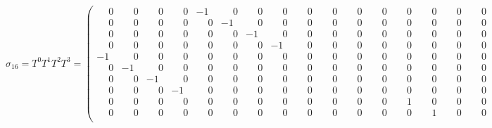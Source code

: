 \documentclass[10pt]{article}
\begin{document}
\[
\sigma_{16} = T^0T^1T^2T^3 = \left(\begin{smallmatrix}
\phantom{-}0 & \phantom{-}0 & \phantom{-}0 & \phantom{-}0 & -1 & \phantom{-}0 & \phantom{-}0 & \phantom{-}0 & \phantom{-}0 & \phantom{-}0 & \phantom{-}0 & \phantom{-}0 & \phantom{-}0 & \phantom{-}0 & \phantom{-}0 & \phantom{-}0 \\
\phantom{-}0 & \phantom{-}0 & \phantom{-}0 & \phantom{-}0 & \phantom{-}0 & -1 & \phantom{-}0 & \phantom{-}0 & \phantom{-}0 & \phantom{-}0 & \phantom{-}0 & \phantom{-}0 & \phantom{-}0 & \phantom{-}0 & \phantom{-}0 & \phantom{-}0 \\
\phantom{-}0 & \phantom{-}0 & \phantom{-}0 & \phantom{-}0 & \phantom{-}0 & \phantom{-}0 & -1 & \phantom{-}0 & \phantom{-}0 & \phantom{-}0 & \phantom{-}0 & \phantom{-}0 & \phantom{-}0 & \phantom{-}0 & \phantom{-}0 & \phantom{-}0 \\
\phantom{-}0 & \phantom{-}0 & \phantom{-}0 & \phantom{-}0 & \phantom{-}0 & \phantom{-}0 & \phantom{-}0 & -1 & \phantom{-}0 & \phantom{-}0 & \phantom{-}0 & \phantom{-}0 & \phantom{-}0 & \phantom{-}0 & \phantom{-}0 & \phantom{-}0 \\
-1 & \phantom{-}0 & \phantom{-}0 & \phantom{-}0 & \phantom{-}0 & \phantom{-}0 & \phantom{-}0 & \phantom{-}0 & \phantom{-}0 & \phantom{-}0 & \phantom{-}0 & \phantom{-}0 & \phantom{-}0 & \phantom{-}0 & \phantom{-}0 & \phantom{-}0 \\
\phantom{-}0 & -1 & \phantom{-}0 & \phantom{-}0 & \phantom{-}0 & \phantom{-}0 & \phantom{-}0 & \phantom{-}0 & \phantom{-}0 & \phantom{-}0 & \phantom{-}0 & \phantom{-}0 & \phantom{-}0 & \phantom{-}0 & \phantom{-}0 & \phantom{-}0 \\
\phantom{-}0 & \phantom{-}0 & -1 & \phantom{-}0 & \phantom{-}0 & \phantom{-}0 & \phantom{-}0 & \phantom{-}0 & \phantom{-}0 & \phantom{-}0 & \phantom{-}0 & \phantom{-}0 & \phantom{-}0 & \phantom{-}0 & \phantom{-}0 & \phantom{-}0 \\
\phantom{-}0 & \phantom{-}0 & \phantom{-}0 & -1 & \phantom{-}0 & \phantom{-}0 & \phantom{-}0 & \phantom{-}0 & \phantom{-}0 & \phantom{-}0 & \phantom{-}0 & \phantom{-}0 & \phantom{-}0 & \phantom{-}0 & \phantom{-}0 & \phantom{-}0 \\
\phantom{-}0 & \phantom{-}0 & \phantom{-}0 & \phantom{-}0 & \phantom{-}0 & \phantom{-}0 & \phantom{-}0 & \phantom{-}0 & \phantom{-}0 & \phantom{-}0 & \phantom{-}0 & \phantom{-}0 & \phantom{-}1 & \phantom{-}0 & \phantom{-}0 & \phantom{-}0 \\
\phantom{-}0 & \phantom{-}0 & \phantom{-}0 & \phantom{-}0 & \phantom{-}0 & \phantom{-}0 & \phantom{-}0 & \phantom{-}0 & \phantom{-}0 & \phantom{-}0 & \phantom{-}0 & \phantom{-}0 & \phantom{-}0 & \phantom{-}1 & \phantom{-}0 & \phantom{-}0 \\

\end{smallmatrix}\]
\end{document}

